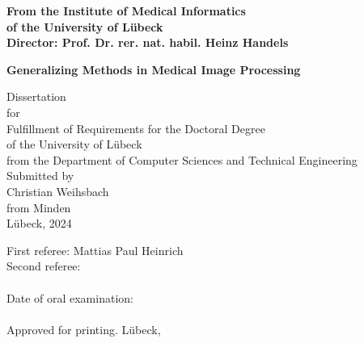 \begin{titlepage}

    \addtolength{\topmargin}{-1.2cm}
    \addtolength{\textwidth}{2.35cm}

    \vspace*{-2.3cm}

    \begin{center}


        \enlargethispage{5cm}
        \textbf{From the Institute of Medical Informatics}\\
        \textbf{of the University of Lübeck}\\
        \textbf{Director: Prof. Dr. rer. nat. habil. Heinz Handels}\\[2.8cm]
        \begin{Large}
            \textbf{Generalizing Methods in Medical Image Processing}\\ %
        \end{Large}

        \vspace*{2.5cm}

        Dissertation\\
        for\\
        Fulfillment of Requirements for the Doctoral Degree\\
        of the University of Lübeck\\[1.0cm]
        from the Department of Computer Sciences and Technical Engineering\\[1.0cm]
        Submitted by\\[0.1cm]
        Christian Weihsbach\\[0.1cm]
        from Minden\\[3.0cm]
        Lübeck, 2024
        \end{center}


    \newpage
    \thispagestyle{empty}

    \addtolength{\topmargin}{1.2cm}
    \addtolength{\textwidth}{-2.35cm}
\end{titlepage}

\begin{titlepage}
    \addtolength{\topmargin}{18cm}
    \noindent First referee: Mattias Paul Heinrich\\
    Second referee:\\\\
    Date of oral examination:\\\\
    Approved for printing. Lübeck,
\end{titlepage}